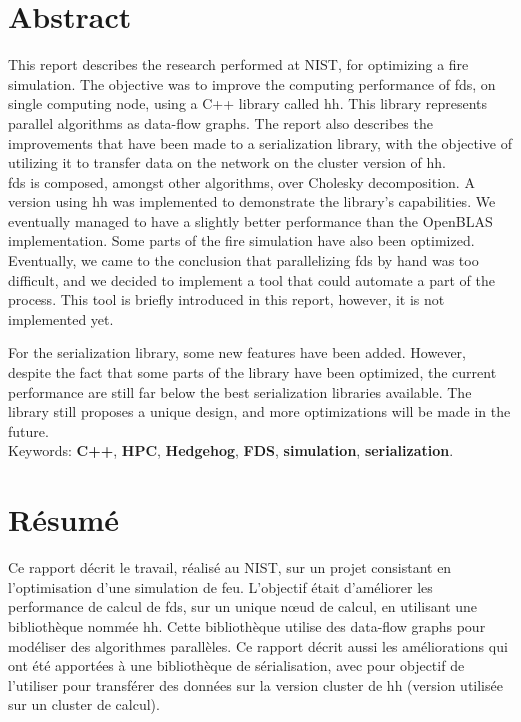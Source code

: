 
\section*{Abstract}

This report describes the research performed at NIST, for optimizing a fire
simulation. The objective was to improve the computing performance of \gls{fds},
on single computing node, using a C++ library called \gls{hh}. This library
represents parallel algorithms as data-flow graphs. The report also describes the
improvements that have been made to a serialization library, with the objective
of utilizing it to transfer data on the network on the cluster version of
\gls{hh}.\\

\gls{fds} is composed, amongst other algorithms, over Cholesky decomposition.
A version using \gls{hh} was implemented to demonstrate the library's
capabilities. We eventually managed to have a slightly better performance than
the OpenBLAS implementation. Some parts of the fire simulation have also been
optimized. Eventually, we came to the conclusion that parallelizing \gls{fds} by
hand was too difficult, and we decided to implement a tool that could automate a
part of the process. This tool is briefly introduced in this report, however, it
is not implemented yet.

For the serialization library, some new features have been added. However,
despite the fact that some parts of the library have been optimized, the current
performance are still far below the best serialization libraries available. The
library still proposes a unique design, and more optimizations will be made in
the future.\\

Keywords: \textbf{C++}, \textbf{HPC}, \textbf{Hedgehog}, \textbf{FDS},
\textbf{simulation}, \textbf{serialization}.

\section*{Résumé}

Ce rapport décrit le travail, réalisé au NIST, sur un projet consistant en
l'optimisation d'une simulation de feu. L'objectif était d'améliorer les
performance de calcul de \gls{fds}, sur un unique nœud de calcul, en utilisant
une bibliothèque nommée \gls{hh}. Cette bibliothèque utilise des data-flow
graphs pour modéliser des algorithmes parallèles. Ce rapport décrit aussi les
améliorations qui ont été apportées à une bibliothèque de sérialisation, avec
pour objectif de l'utiliser pour transférer des données sur la version cluster
de \gls{hh} (version utilisée sur un cluster de calcul).\\

